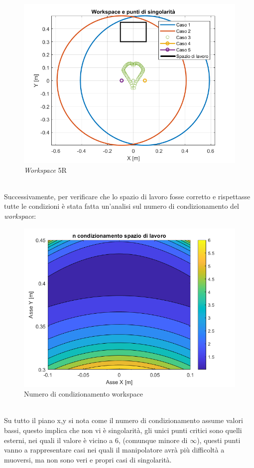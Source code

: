 \begin{figure}[ht]
	\begin{center}
		\includegraphics[scale=0.6]{Immagini/Singolarity/Worksing}
		\caption{\textit{Workspace} 5R}
	\end{center}
\end{figure}
\\Successivamente, per verificare che lo spazio di lavoro fosse corretto e rispettasse tutte le condizioni è stata fatta un'analisi sul numero di condizionamento del \textit{workspace}:
\begin{figure}[ht]
	\begin{center}
		\includegraphics[scale=0.6]{Immagini/Singolarity/ncondsl}
		\caption{Numero di condizionamento workspace}
	\end{center}
\end{figure}
\\Su tutto il piano x,y si nota come il numero di condizionamento assume valori bassi, questo implica che non vi è singolarità, gli unici punti critici sono quelli esterni, nei quali il valore è vicino a 6, (comunque minore di $\infty$), questi punti vanno a rappresentare casi nei quali il manipolatore avrà più difficoltà a muoversi, ma non sono veri e propri casi di singolarità.